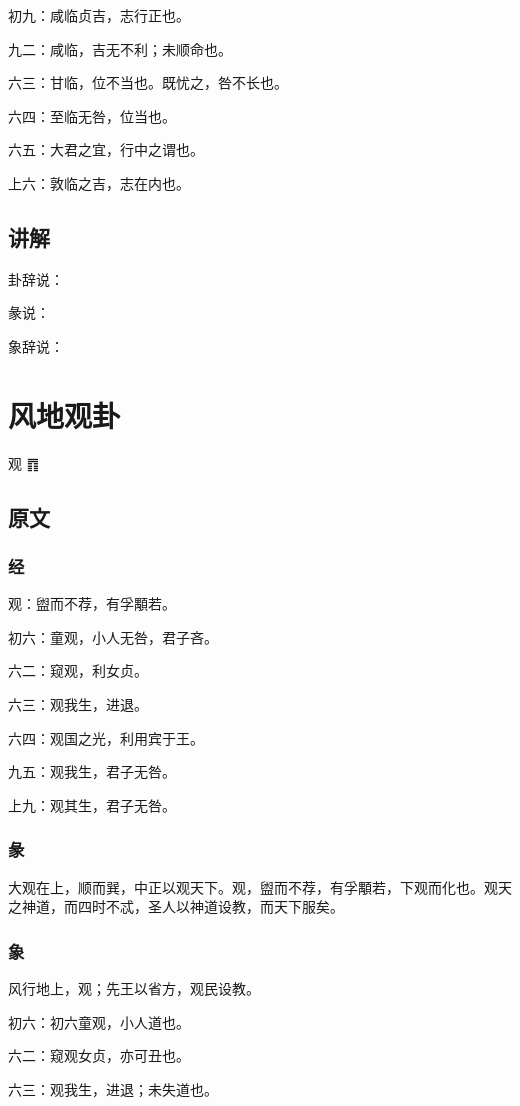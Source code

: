 \documentclass[12pt,oneside]{book}
\begin{document}
初九：咸临贞吉，志行正也。

九二：咸临，吉无不利；未顺命也。

六三：甘临，位不当也。既忧之，咎不长也。

六四：至临无咎，位当也。

六五：大君之宜，行中之谓也。

上六：敦临之吉，志在内也。

\section{讲解}
卦辞说：

彖说：

象辞说：


\chapter{风地观卦}
观 {\Large ䷓}

\section{原文}

\subsection{经}
观：盥而不荐，有孚顒若。

初六：童观，小人无咎，君子吝。

六二：窥观，利女贞。

六三：观我生，进退。

六四：观国之光，利用宾于王。

九五：观我生，君子无咎。

上九：观其生，君子无咎。

\subsection{彖}
大观在上，顺而巽，中正以观天下。观，盥而不荐，有孚顒若，下观而化也。观天之神道，而四时不忒，圣人以神道设教，而天下服矣。

\subsection{象}
风行地上，观；先王以省方，观民设教。

初六：初六童观，小人道也。

六二：窥观女贞，亦可丑也。

六三：观我生，进退；未失道也。
\end{document}
